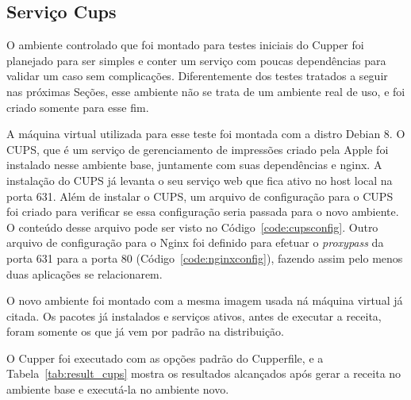 \subsection{Serviço Cups}
O ambiente controlado que foi montado para testes iniciais do Cupper foi planejado
para ser simples e conter um serviço com poucas dependências para validar um caso
sem complicações. Diferentemente dos testes tratados a seguir nas próximas Seções,
esse ambiente não se trata de um ambiente real de uso, e foi criado somente para
esse fim.

A máquina virtual utilizada para esse teste foi montada com a distro Debian 8.
O CUPS, que é um serviço de gerenciamento de impressões criado pela Apple foi
instalado nesse ambiente base, juntamente com suas dependências e nginx. A instalação
do CUPS já levanta o seu serviço web que fica ativo no host local na porta 631.
Além de instalar o CUPS, um arquivo de configuração para o CUPS foi criado
para verificar se essa configuração seria passada para o novo ambiente. O
conteúdo desse arquivo pode ser visto no Código~\ref{code:cupsconfig}. Outro 
arquivo de configuração para o Nginx foi definido para efetuar o 
\textit{proxypass} da porta 631 para a porta 80 (Código~\ref{code:nginxconfig}), fazendo assim pelo menos duas
aplicações se relacionarem.

O novo ambiente foi montado com a mesma imagem usada ná máquina virtual já citada.
Os pacotes já instalados e serviços ativos, antes de executar a receita, foram somente 
os que já vem por padrão na distribuição.

O Cupper foi executado com as opções padrão do Cupperfile, e a Tabela~\ref{tab:result_cups}
mostra os resultados alcançados após gerar a receita no ambiente base e executá-la
no ambiente novo.


